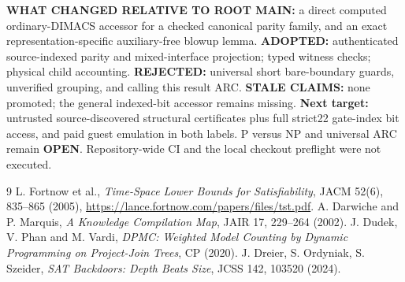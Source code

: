 \documentclass[11pt]{article}
\begin{document}
\noindent\textbf{WHAT CHANGED RELATIVE TO ROOT MAIN:} a direct computed ordinary-DIMACS accessor for a checked canonical parity family, and an exact representation-specific auxiliary-free blowup lemma. \textbf{ADOPTED:} authenticated source-indexed parity and mixed-interface projection; typed witness checks; physical child accounting. \textbf{REJECTED:} universal short bare-boundary guards, unverified grouping, and calling this result ARC. \textbf{STALE CLAIMS:} none promoted; the general indexed-bit accessor remains missing. \textbf{Next target:} untrusted source-discovered structural certificates plus full strict22 gate-index bit access, and paid guest emulation in both labels. P versus NP and universal ARC remain \textbf{OPEN}. Repository-wide CI and the local checkout preflight were not executed.
\begin{thebibliography}{9}
 L. Fortnow et al., \emph{Time-Space Lower Bounds for Satisfiability}, JACM 52(6), 835--865 (2005), \url{https://lance.fortnow.com/papers/files/tst.pdf}.
 A. Darwiche and P. Marquis, \emph{A Knowledge Compilation Map}, JAIR 17, 229--264 (2002).
 J. Dudek, V. Phan and M. Vardi, \emph{DPMC: Weighted Model Counting by Dynamic Programming on Project-Join Trees}, CP (2020).
 J. Dreier, S. Ordyniak, S. Szeider, \emph{SAT Backdoors: Depth Beats Size}, JCSS 142, 103520 (2024).
\end{thebibliography}
\end{document}
